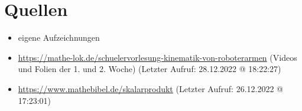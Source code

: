 \documentclass{article}
\begin{document}








    \newpage

    \section{Quellen}

    \begin{itemize}
        \item eigene Aufzeichnungen
        \item \url{https://mathe-lok.de/schuelervorlesung-kinematik-von-roboterarmen} (Videos und Folien der 1. und 2. Woche) (Letzter Aufruf: 28.12.2022 @ 18:22:27)
        \item \url{https://www.mathebibel.de/skalarprodukt} (Letzter Aufruf: 26.12.2022 @ 17:23:01)
    \end{itemize}
\end{document}
